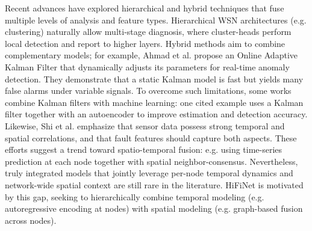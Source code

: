 Recent advances have explored hierarchical and hybrid techniques that fuse multiple levels of analysis and feature types. Hierarchical WSN architectures (e.g. clustering) naturally allow multi-stage diagnosis, where cluster-heads perform local detection and report to higher layers. Hybrid methods aim to combine complementary models; for example, Ahmad et al. propose an Online Adaptive Kalman Filter that dynamically adjusts its parameters for real-time anomaly detection. They demonstrate that a static Kalman model is fast but yields many false alarms under variable signals. To overcome such limitations, some works combine Kalman filters with machine learning: one cited example uses a Kalman filter together with an autoencoder to improve estimation and detection accuracy. Likewise, Shi et al. emphasize that sensor data possess strong temporal and spatial correlations, and that fault features should capture both aspects. These efforts suggest a trend toward spatio-temporal fusion: e.g. using time-series prediction at each node together with spatial neighbor-consensus. Nevertheless, truly integrated models that jointly leverage per-node temporal dynamics and network-wide spatial context are still rare in the literature. HiFiNet is motivated by this gap, seeking to hierarchically combine temporal modeling (e.g. autoregressive encoding at nodes) with spatial modeling (e.g. graph-based fusion across nodes).
